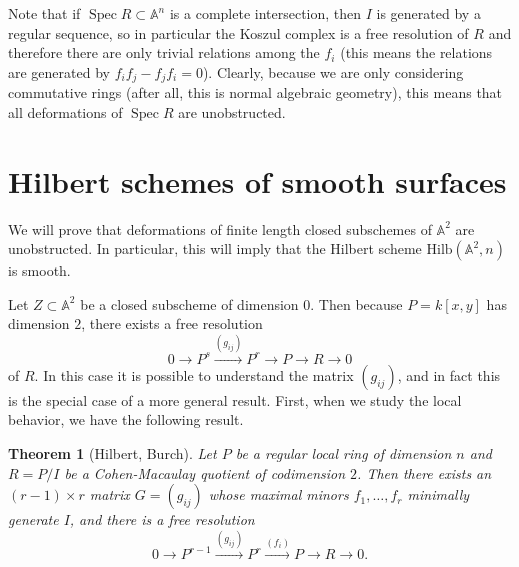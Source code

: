 \documentclass{amsart}
\newtheorem{thm}{Theorem}[section]
\theoremstyle{definition}
\theoremstyle{remark}
\theoremstyle{plain}
\theoremstyle{definition}
\theoremstyle{remark}
\newcommand{\A}{\mathbb{A}}
\newcommand{\mr}[1]{\mathrm{#1}}
\newcommand{\1}{\mathbf{1}}
\newcommand{\2}{\mathbf{2}}
\newcommand{\3}{\mathbf{3}}
\DeclareMathOperator{\Spec}{Spec}
\begin{document}
Note that if $\Spec R \subset \A^n$ is a complete intersection, then $I$ is generated by a regular sequence, so in particular the Koszul complex is a free resolution of $R$ and therefore there are only trivial relations among the $f_i$ (this means the relations are generated by $f_i f_j - f_j f_i = 0$). Clearly, because we are only considering commutative rings (after all, this is normal algebraic geometry), this means that all deformations of $\Spec R$ are unobstructed.

\section{Hilbert schemes of smooth surfaces}%
\label{sec:hilbert_schemes_of_smooth_surfaces}

We will prove that deformations of finite length closed subschemes of $\A^2$ are unobstructed. In particular, this will imply that the Hilbert scheme $\mr{Hilb}(\A^2, n)$ is smooth.

Let $Z \subset \A^2$ be a closed subscheme of dimension $0$. Then because $P = k[x,y]$ has dimension $2$, there exists a free resolution
\[ 0 \to P^s \xrightarrow{(g_{ij})} P^r \to P \to R \to 0 \]
of $R$. In this case it is possible to understand the matrix $(g_{ij})$, and in fact this is the special case of a more general result. First, when we study the local behavior, we have the following result.
\begin{thm}[Hilbert, Burch]
    Let $P$ be a regular local ring of dimension $n$ and $R = P/I$ be a Cohen-Macaulay quotient of codimension $2$. Then there exists an $(r-1) \times r$ matrix $G = (g_{ij})$ whose maximal minors $f_1, \ldots, f_r$ minimally generate $I$, and there is a free resolution
    \[ 0 \to P^{r-1} \xrightarrow{(g_{ij})} P^r \xrightarrow{(f_i)} P \to R \to 0. \]
\end{thm}
\end{document}
